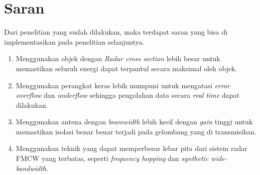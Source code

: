 \section{Saran}

Dari penelitian yang sudah dilakukan, maka terdapat saran yang bisa di implementasikan pada penelitian selanjuntya.

\begin{enumerate}
    \item Menggunakan objek dengan \textit{Radar cross section} lebih besar untuk memastikan seluruh energi dapat terpantul secara maksimal oleh objek.
    \item Menggunakan perangkat keras lebih mumpuni untuk mengatasi \textit{error overflow} dan \textit{underflow} sehingga pengolahan data secara \textit{real time} dapat dilakukan.
    \item Menggunakan antena dengan \textit{beamwidth} lebih kecil dengan \textit{gain} tinggi untuk memastikan isolasi benar benar terjadi pada gelombang yang di transmisikan.
    \item Menggunakan teknik yang dapat memperbesar lebar pita dari sistem radar FMCW yang terbatas, seperti \textit{frequency hopping} dan \textit{synthetic wide-bandwidth}.
\end{enumerate}
